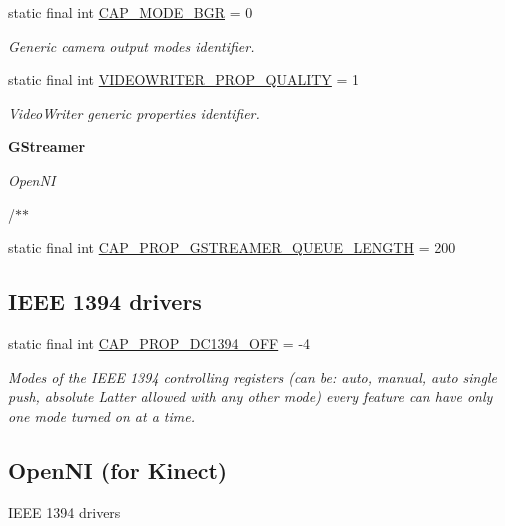 \begin{DoxyCompactItemize}
static final int \hyperlink{group__videoio__flags__base_gaadf3dff0251965990b45d02868b90b23}{C\+A\+P\+\_\+\+M\+O\+D\+E\+\_\+\+B\+GR} = 0
\begin{DoxyCompactList}\small\item\em Generic camera output modes identifier. \end{DoxyCompactList}\item 
static final int \hyperlink{group__videoio__flags__base_gac45c570604a0024fe45239139e0d4e5b}{V\+I\+D\+E\+O\+W\+R\+I\+T\+E\+R\+\_\+\+P\+R\+O\+P\+\_\+\+Q\+U\+A\+L\+I\+TY} = 1
\begin{DoxyCompactList}\small\item\em Video\+Writer generic properties identifier. \end{DoxyCompactList}\end{DoxyCompactItemize}
\begin{Indent}\textbf{ G\+Streamer}\par
{\em Open\+NI 

/$\ast$$\ast$ }\begin{DoxyCompactItemize}
\item 
static final int \hyperlink{group__videoio__flags__others_gafbbac7fafc3f6386e3234a007d25b25d}{C\+A\+P\+\_\+\+P\+R\+O\+P\+\_\+\+G\+S\+T\+R\+E\+A\+M\+E\+R\+\_\+\+Q\+U\+E\+U\+E\+\_\+\+L\+E\+N\+G\+TH} = 200
\end{DoxyCompactItemize}
\end{Indent}
\subsection*{I\+E\+EE 1394 drivers}
\begin{DoxyCompactItemize}
\item 
static final int \hyperlink{group__videoio__flags__others_gad6592d7bfce8b9138f5a334ae87a5ff9}{C\+A\+P\+\_\+\+P\+R\+O\+P\+\_\+\+D\+C1394\+\_\+\+O\+FF} = -\/4
\begin{DoxyCompactList}\small\item\em Modes of the I\+E\+EE 1394 controlling registers (can be\+: auto, manual, auto single push, absolute Latter allowed with any other mode) every feature can have only one mode turned on at a time. \end{DoxyCompactList}\end{DoxyCompactItemize}
\subsection*{Open\+NI (for Kinect)}
\label{_amgrp848bd3907cdb4b9cd483b8d19dbc52c3}%
 I\+E\+EE 1394 drivers 

